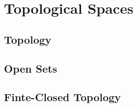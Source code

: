 \chapter{Topological Spaces}

\section{Topology}



\section{Open Sets}



\section{Finte-Closed Topology}



